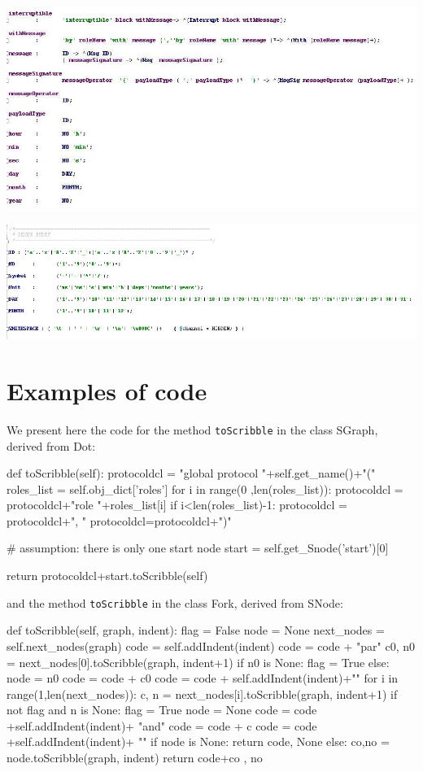 \documentclass[a4paper,11pt,twoside]{report}
\begin{document}
\includegraphics[width=18cm]{parser3}

\includegraphics[width=18cm]{lexer}

\section{Examples of code}
We present here the code for the method \texttt{toScribble} in the class SGraph, derived from Dot:
\begin{SJLISTING}
def toScribble(self):
        protocoldcl = "global protocol "+self.get_name()+"("
        roles_list = self.obj_dict['roles']
        for i in range(0 ,len(roles_list)):
            protocoldcl = protocoldcl+"role "+roles_list[i]
            if i<len(roles_list)-1:
                protocoldcl = protocoldcl+", "
        protocoldcl=protocoldcl+")"
        
        # assumption: there is only one start node
        start = self.get_Snode('start')[0]
        
        return protocoldcl+start.toScribble(self)
\end{SJLISTING}
and the method \texttt{toScribble} in the class Fork, derived from SNode:
\begin{SJLISTING}
def toScribble(self, graph, indent):
        flag = False
        node = None
        next_nodes = self.next_nodes(graph)
        code = self.addIndent(indent)
        code = code + "par{"
        c0, n0 = next_nodes[0].toScribble(graph, indent+1)
        if n0 is None:
            flag = True
        else:
            node = n0
        code = code + c0
        code = code + self.addIndent(indent)+"}"
        for i in range(1,len(next_nodes)):
            c, n = next_nodes[i].toScribble(graph, indent+1)
            if not flag and n is None:
                flag = True
                node = None 
            code = code +self.addIndent(indent)+ "and{"
            code = code + c
            code = code +self.addIndent(indent)+ "}"
        if node is None:
            return code, None
        else:
            co,no = node.toScribble(graph, indent)
            return code+co , no
\end{SJLISTING}
\end{document}
